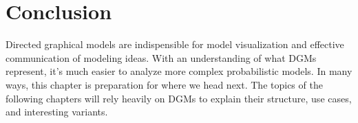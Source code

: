 \section{Conclusion}
Directed graphical models are indispensible for model visualization and effective communication of modeling ideas. With an understanding of what DGMs represent, it's much easier to analyze more complex probabilistic models. In many ways, this chapter is preparation for where we head next. The topics of the following chapters will rely heavily on DGMs to explain their structure, use cases, and interesting variants.